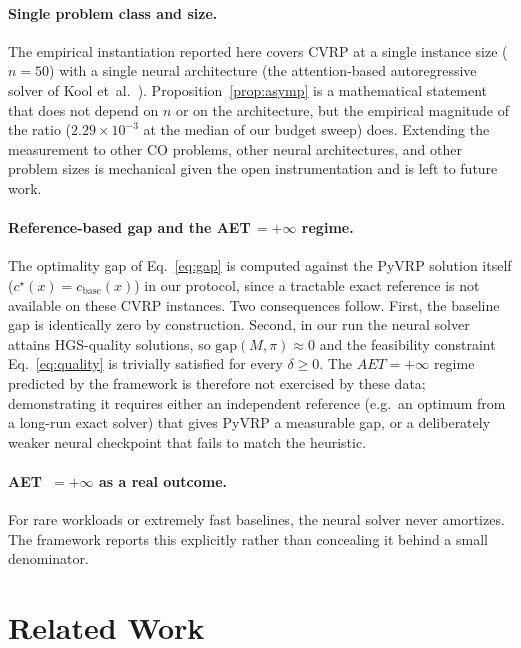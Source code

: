 \documentclass[11pt]{article}
\newcommand{\AET}{AET}
\begin{document}
\paragraph{Single problem class and size.} The empirical instantiation reported here covers CVRP at a single instance size (\(n=50\)) with a single neural architecture (the attention-based autoregressive solver of Kool et~al.~\cite{kool2019attention}). Proposition~\ref{prop:asymp} is a mathematical statement that does not depend on \(n\) or on the architecture, but the empirical magnitude of the ratio (\(2.29\times10^{-3}\) at the median of our budget sweep) does. Extending the measurement to other CO problems, other neural architectures, and other problem sizes is mechanical given the open instrumentation and is left to future work.

\paragraph{Reference-based gap and the AET\,$=+\infty$ regime.} The optimality gap of Eq.~\eqref{eq:gap} is computed against the PyVRP solution itself (\(c^\star(x) = c_\text{base}(x)\)) in our protocol, since a tractable exact reference is not available on these CVRP instances. Two consequences follow. First, the baseline gap is identically zero by construction. Second, in our run the neural solver attains HGS-quality solutions, so \(\mathrm{gap}(M,\pi) \approx 0\) and the feasibility constraint Eq.~\eqref{eq:quality} is trivially satisfied for every \(\delta \geq 0\). The \(\AET = +\infty\) regime predicted by the framework is therefore not exercised by these data; demonstrating it requires either an independent reference (e.g.\ an optimum from a long-run exact solver) that gives PyVRP a measurable gap, or a deliberately weaker neural checkpoint that fails to match the heuristic.

\paragraph{\AET\ \(= +\infty\) as a real outcome.} For rare workloads
or extremely fast baselines, the neural solver never amortizes. The framework reports this explicitly rather than concealing it behind a small denominator.

\section{Related Work}
\label{sec:related}
\end{document}
